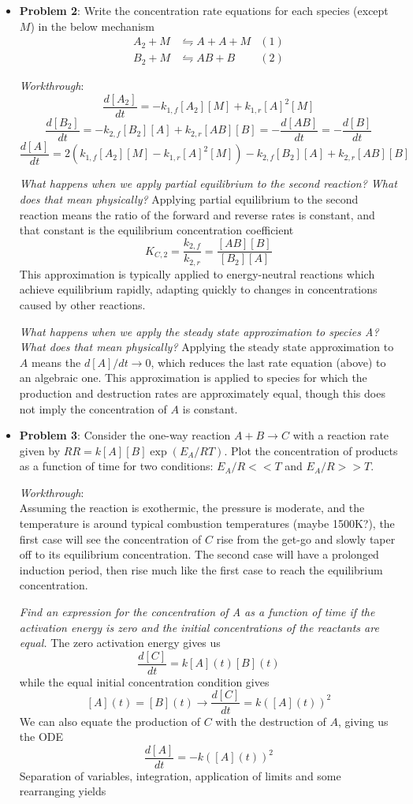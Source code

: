 \documentclass[11pt]{article}
\newcommand{\Item}[1]{\item \textbf{#1}:}
\newcommand{\CenteredBoxed}[1]{\begin{center}\boxed{#1}\end{center}}
\newcommand{\Problem}[1]{\Item{Problem #1}}
\begin{document}
\begin{itemize}
\Problem{2} Write the concentration rate equations for each species (except $M$) in the below mechanism
\begin{align*}
A_2 + M &\leftrightharpoons A + A + M & (1)\\
B_2 + M &\leftrightharpoons AB + B & (2)
\end{align*}

\emph{Workthrough}:
$$\frac{d[A_2]}{dt} = -k_{1,f}[A_2][M] + k_{1,r}[A]^2[M]$$
$$\frac{d[B_2]}{dt} = -k_{2,f}[B_2][A] + k_{2,r}[AB][B] = -\frac{d[AB]}{dt} = -\frac{d[B]}{dt}$$
$$\frac{d[A]}{dt} = 2(k_{1,f}[A_2][M] - k_{1,r}[A]^2[M]) -k_{2,f}[B_2][A] + k_{2,r}[AB][B]$$

\emph{What happens when we apply partial equilibrium to the second reaction? What does that mean physically?} Applying partial equilibrium to the second reaction means the ratio of the forward and reverse rates is constant, and that constant is the equilibrium concentration coefficient
$$K_{C,2} = \frac{k_{2,f}}{k_{2,r}} = \frac{[AB][B]}{[B_2][A]}$$
This approximation is typically applied to energy-neutral reactions which achieve equilibrium rapidly, adapting quickly to changes in concentrations caused by other reactions.

\emph{What happens when we apply the steady state approximation to species A? What does that mean physically?} Applying the steady state approximation to $A$ means the $d[A]/dt\to0$, which reduces the last rate equation (above) to an algebraic one. This approximation is applied to species for which the production and destruction rates are approximately equal, though this does not imply the concentration of $A$ is constant.

\Problem{3} Consider the one-way reaction $A+B\to C$ with a reaction rate given by $RR = k[A][B]\exp\left(E_A/RT\right)$. Plot the concentration of products as a function of time for two conditions: $E_A/R <<T$ and $E_A/R >>T$.

\emph{Workthrough}:\\
Assuming the reaction is exothermic, the pressure is moderate, and the temperature is around typical combustion temperatures (maybe 1500K?), the first case will see the concentration of $C$ rise from the get-go and slowly taper off to its equilibrium concentration. The second case will have a prolonged induction period, then rise much like the first case to reach the equilibrium concentration.

\emph{Find an expression for the concentration of A as a function of time if the activation energy is zero and the initial concentrations of the reactants are equal.} The zero activation energy gives us
$$\frac{d[C]}{dt} = k[A](t)[B](t)$$
while the equal initial concentration condition gives
$$[A](t)=[B](t)\to\frac{d[C]}{dt} = k\left([A](t)\right)^2$$
We can also equate the production of $C$ with the destruction of $A$, giving us the ODE
$$\frac{d[A]}{dt} = -k\left([A](t)\right)^2$$
Separation of variables, integration, application of limits and some rearranging yields
\CenteredBoxed{[A](t) = \frac{[A]_0}{1+k[A]_0t}}


\end{itemize}
\end{document}
